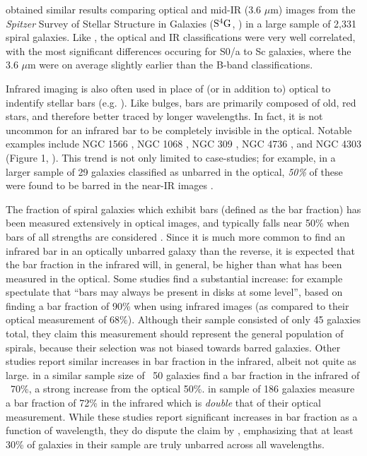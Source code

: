 \citet{Buta2010} obtained similar results comparing optical and mid-IR (3.6 $\mu$m) images from the \textit{Spitzer} Survey of Stellar Structure in Galaxies ($\rm S^4G$, \citet{Sheth2010}) in a large sample of 2,331 spiral galaxies. Like \citet{Eskridge2002}, the optical and IR classifications were very well correlated, with the most significant differences occuring for S0/a to Sc galaxies, where the 3.6 $\mu$m were on average slightly earlier than the B-band classifications.

Infrared imaging is also often used in place of (or in addition to) optical to indentify stellar bars (e.g. \citet{Mulchaey1997,Knapen2000,Block2004,Sheth2008}). Like bulges, bars are primarily composed of old, red stars, and therefore better traced by longer wavelengths. In fact, it is not uncommon for an infrared bar to be completely invisible in the optical. Notable examples include NGC 1566 \citep{Hackwell1983}, NGC 1068 \citep{Thronson1989,Scoville1988}, NGC 309 \citep{Block1991}, NGC 4736 \citep{Block1994}, and NGC 4303 (Figure 1, \citet{Sheth2003}). This trend is not only limited to case-studies; for example, in a larger sample of 29 galaxies classified as unbarred in the optical, \emph{50\%} of these were found to be barred in the near-IR images \citep{Mulchaey1997}.

The fraction of spiral galaxies which exhibit bars (defined as the bar fraction) has been measured extensively in optical images, and typically falls near 50\% when bars of all strengths are considered \citep{Sheth2008,Masters2010,Galloway2015,Consolandi2017}. Since it is much more common to find an infrared bar in an optically unbarred galaxy than the reverse, it is expected that the bar fraction in the infrared will, in general, be higher than what has been measured in the optical. Some studies find a substantial increase: \citet{Seigar1998} for example spectulate that ``bars may always be present in disks at some level'', based on finding a bar fraction of 90\% when using infrared images (as compared to their optical measurement of 68\%). Although their sample consisted of only 45 galaxies total, they claim this measurement should represent the general population of spirals, because their selection was not biased towards barred galaxies. Other studies report similar increases in bar fraction in the infrared, albeit not quite as large. \citet{Knapen2000} in a similar sample size of ~50 galaxies find a bar fraction in the infrared of ~70\%, a strong increase from the optical 50\%. \citet{Eskridge2000} in sample of 186 galaxies measure a bar fraction of 72\% in the infrared which is \emph{double} that of their optical measurement. While these studies report significant increases in bar fraction as a function of wavelength, they do dispute the claim by \citet{Seigar1998}, emphasizing that at least 30\% of galaxies in their sample are truly unbarred across all wavelengths.

